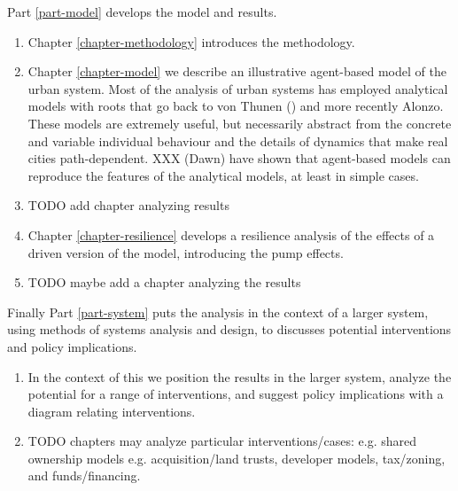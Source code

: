 Part \ref{part-model} develops the model and results.
\begin{enumerate}
    \item Chapter \ref{chapter-methodology} introduces the methodology. %
    \item Chapter \ref{chapter-model} we  describe an illustrative agent-based model of the urban system. Most of the analysis of urban systems has employed analytical models with roots that go back to von Thunen () and more recently Alonzo. These models are extremely useful, but necessarily abstract from the concrete  and variable individual behaviour and  the details  of dynamics that make real cities path-dependent. XXX (Dawn) have shown that agent-based models can reproduce the features of the analytical models, at least in simple cases. 
    \item TODO add chapter analyzing results
    \item Chapter \ref{chapter-resilience} develops a resilience analysis of the effects of a driven version of the model, introducing the pump effects.
    \item TODO maybe add a chapter analyzing the results
\end{enumerate}

 Finally Part \ref{part-system} puts the analysis %
in the context of a larger system, using methods of systems analysis and design, to discusses potential interventions and policy implications.
\begin{enumerate}
    \item In the context of this we position the results in the larger system, analyze the potential for a range of interventions, and suggest policy implications with a diagram relating interventions.
    \item TODO chapters may analyze particular interventions/cases: e.g. shared ownership models e.g. acquisition/land trusts, developer models, tax/zoning, and funds/financing.
\end{enumerate}


